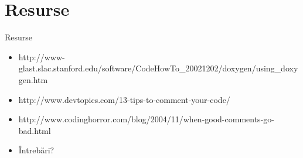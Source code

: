 \documentclass{beamer}
\begin{document}
\section{Resurse}

\begin{frame}{Resurse}
  \begin{itemize}
  \item http://www-glast.slac.stanford.edu/software/CodeHowTo\_20021202/doxygen/using\_doxygen.htm
  \pause
  \item http://www.devtopics.com/13-tips-to-comment-your-code/
  \pause
  \item http://www.codinghorror.com/blog/2004/11/when-good-comments-go-bad.html  
  \pause
  \vspace{10mm}
  \item Întrebări?
  \end{itemize}
\end{frame}

\begin{frame}{}
\end{frame}
\end{document}
